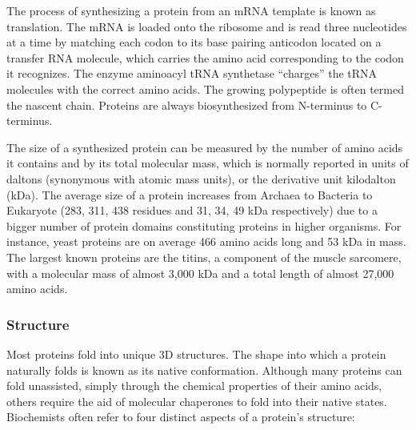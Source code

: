 The process of synthesizing a protein from an mRNA template is known as
translation. The mRNA is loaded onto the ribosome and is read three
nucleotides at a time by matching each codon to its base pairing
anticodon located on a transfer RNA molecule, which carries the amino
acid corresponding to the codon it recognizes. The enzyme aminoacyl tRNA
synthetase ``charges'' the tRNA molecules with the correct amino acids.
The growing polypeptide is often termed the nascent chain. Proteins are
always biosynthesized from N-terminus to C-terminus.

The size of a synthesized protein can be measured by the number of amino
acids it contains and by its total molecular mass, which is normally
reported in units of daltons (synonymous with atomic mass units), or the
derivative unit kilodalton (kDa). The average size of a protein
increases from Archaea to Bacteria to Eukaryote (283, 311, 438 residues
and 31, 34, 49 kDa respectively) due to a bigger number of protein
domains constituting proteins in higher organisms. For instance, yeast
proteins are on average 466 amino acids long and 53 kDa in mass. The
largest known proteins are the titins, a component of the muscle
sarcomere, with a molecular mass of almost 3,000 kDa and a total length
of almost 27,000 amino acids.

\hypertarget{structure}{%
\subsubsection{Structure}\label{structure}}

Most proteins fold into unique 3D structures. The shape into which a
protein naturally folds is known as its native conformation. Although
many proteins can fold unassisted, simply through the chemical
properties of their amino acids, others require the aid of molecular
chaperones to fold into their native states. Biochemists often refer to
four distinct aspects of a protein's structure:


